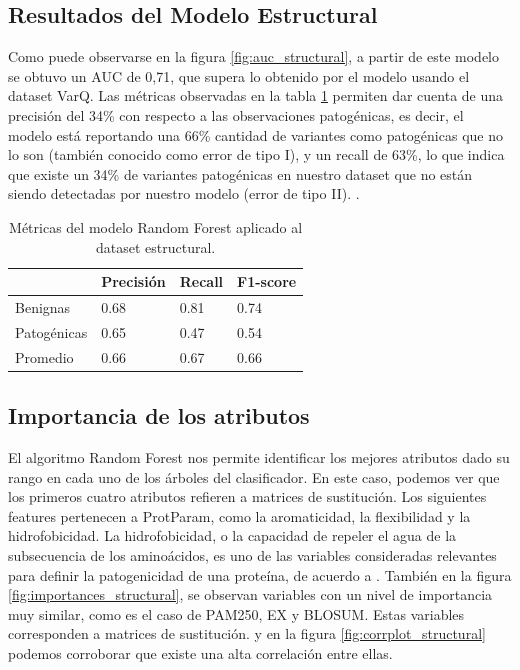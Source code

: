 \subsection{Resultados del Modelo Estructural}

Como puede observarse en la figura \ref{fig:auc_structural}, a partir de este modelo se obtuvo un AUC de 0,71, que supera lo obtenido por el modelo usando el dataset VarQ. Las métricas observadas en la tabla \ref{structural_table} permiten dar cuenta de una precisión del 34\% con respecto a las observaciones patogénicas, es decir, el modelo está reportando una 66\% cantidad de variantes como patogénicas que no lo son (también conocido como error de tipo I), y un recall de 63\%, lo que indica que existe un 34\% de variantes patogénicas en nuestro dataset que no están siendo detectadas por nuestro modelo (error de tipo II). .

\begin{table}[H]
\centering
\begin{tabular}{|l|l|l|l|}
\hline
              & Precisión & Recall & F1-score \\ \hline
Benignas      & 0.68      & 0.81   & 0.74     \\ \hline
Patogénicas   & 0.65      & 0.47   & 0.54     \\ \hline
Promedio      & 0.66      & 0.67   & 0.66     \\ \hline
\end{tabular}
\caption{Métricas del modelo Random Forest aplicado al dataset estructural.}
\label{structural_table}
\end{table}


\subsection{Importancia de los atributos}

El algoritmo Random Forest nos permite identificar los mejores atributos dado su rango en cada uno de los árboles del clasificador. En este caso, podemos ver que los primeros cuatro atributos refieren a matrices de sustitución. Los siguientes features pertenecen a ProtParam, como la aromaticidad, la flexibilidad y la hidrofobicidad. La hidrofobicidad, o la capacidad de repeler el agua de la subsecuencia de los aminoácidos, es uno de las variables consideradas relevantes para definir la patogenicidad de una proteína, de acuerdo a \cite{Wang2016}. También en la figura \ref{fig:importances_structural}, se observan variables con un nivel de importancia muy similar, como es el caso de PAM250, EX y BLOSUM. Estas variables corresponden a matrices de sustitución. y en la figura \ref{fig:corrplot_structural} podemos corroborar que existe una alta correlación entre ellas.  

